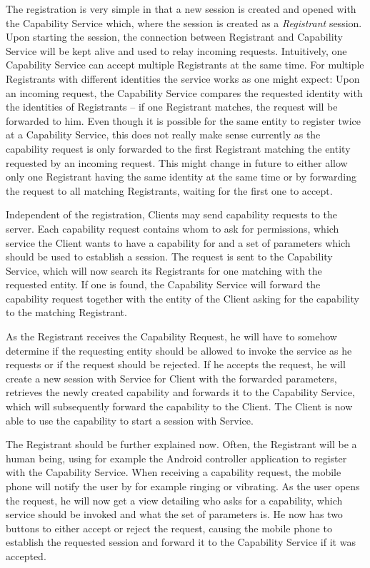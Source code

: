 The registration is very simple in that a new session is created and opened with the Capability Service which, where the session is created as a \emph{Registrant} session.
Upon starting the session, the connection between Registrant and Capability Service will be kept alive and used to relay incoming requests.
Intuitively, one Capability Service can accept multiple Registrants at the same time.
For multiple Registrants with different identities the service works as one might expect:
Upon an incoming request, the Capability Service compares the requested identity with the identities of Registrants -- if one Registrant matches, the request will be forwarded to him.
Even though it is possible for the same entity to register twice at a Capability Service, this does not really make sense currently as the capability request is only forwarded to the first Registrant matching the entity requested by an incoming request.
This might change in future to either allow only one Registrant having the same identity at the same time or by forwarding the request to all matching Registrants, waiting for the first one to accept.

Independent of the registration, Clients may send capability requests to the server.
Each capability request contains whom to ask for permissions, which service the Client wants to have a capability for and a set of parameters which should be used to establish a session.
The request is sent to the Capability Service, which will now search its Registrants for one matching with the requested entity.
If one is found, the Capability Service will forward the capability request together with the entity of the Client asking for the capability to the matching Registrant.

As the Registrant receives the Capability Request, he will have to somehow determine if the requesting entity should be allowed to invoke the service as he requests or if the request should be rejected.
If he accepts the request, he will create a new session with Service for Client with the forwarded parameters, retrieves the newly created capability and forwards it to the Capability Service, which will subsequently forward the capability to the Client.
The Client is now able to use the capability to start a session with Service.

\medskip

The Registrant should be further explained now.
Often, the Registrant will be a human being, using for example the Android controller application to register with the Capability Service.
When receiving a capability request, the mobile phone will notify the user by for example ringing or vibrating.
As the user opens the request, he will now get a view detailing who asks for a capability, which service should be invoked and what the set of parameters is.
He now has two buttons to either accept or reject the request, causing the mobile phone to establish the requested session and forward it to the Capability Service if it was accepted.

